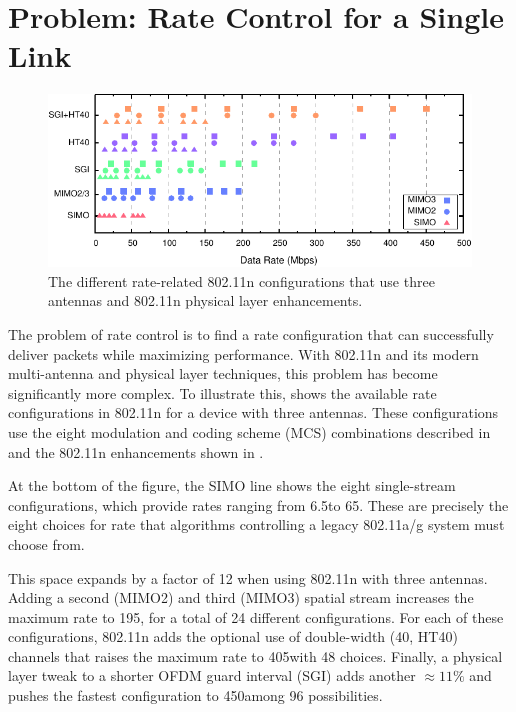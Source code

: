 \section{Problem: Rate Control for a Single Link}
\begin{figure}[t]
	\centering
	\includegraphics[width=\textwidth]{figures/approach/rate_configs.pdf}
	\caption[The rate-related 802.11n configurations that use three antennas]{\label{fig:rate_configs}The different rate-related 802.11n configurations that use three antennas and 802.11n physical layer enhancements.}
\end{figure}

The problem of rate control is to find a rate configuration that can successfully deliver packets while maximizing performance.  With 802.11n and its modern multi-antenna and physical layer techniques, this problem has become significantly more complex. To illustrate this,  shows the available rate configurations in 802.11n for a device with three antennas. These configurations use the eight modulation and coding scheme (MCS) combinations described in  and the 802.11n enhancements shown in .

At the bottom of the figure, the SIMO line shows the eight single-stream configurations, which provide rates ranging from 6.5\Mbps to 65\Mbps. These are precisely the eight choices for rate that algorithms controlling a legacy 802.11a/g system must choose from.

This space expands by a factor of 12 when using 802.11n with three antennas. Adding a second (MIMO2) and third (MIMO3) spatial stream increases the maximum rate to 195\Mbps, for a total of 24 different configurations. For each of these configurations, 802.11n adds the optional use of double-width (40\MHz, HT40) channels that raises the maximum rate to 405\Mbps with 48 choices. Finally, a physical layer tweak to a shorter OFDM guard interval (SGI) adds another $\approx 11\%$ and pushes the fastest configuration to 450\Mbps among 96 possibilities.

